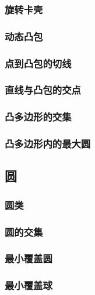 \documentclass[a4paper]{article}
\newcommand{\cppcode}[1]{
    \inputminted[mathescape]{cpp}{source/#1}
}
\begin{document}
\cppcode{computational-geometry/point-in-polygon.cpp}

\subsubsection{旋转卡壳}

\subsubsection{动态凸包}

\subsubsection{点到凸包的切线}

\subsubsection{直线与凸包的交点}

\subsubsection{凸多边形的交集}

\subsubsection{凸多边形内的最大圆}

\subsection{圆}

\subsubsection{圆类}

\subsubsection{圆的交集}

\subsubsection{最小覆盖圆}

\subsubsection{最小覆盖球}
\end{document}
